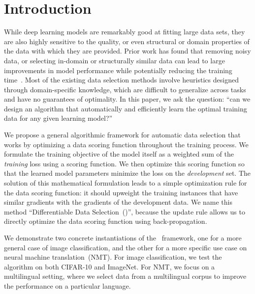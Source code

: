 \section{\label{sec:intro} Introduction}

While deep learning models are remarkably good at fitting large data sets, they are also highly sensitive to the quality, or even structural or domain properties of the data with which they are provided.
Prior work has found that removing noisy data, or selecting in-domain or structurally similar data can lead to large improvements in model performance while potentially reducing the training time~\citep{jiang-zhai-2007-instance,wang-etal-2017-instance,axelrod2011domain,foster-etal-2010-discriminative,moore2010intelligent}. Most of the existing data selection methods involve heuristics designed through domain-specific knowledge, which are difficult to generalize across tasks and have no guarantees of optimality.
In this paper, we ask the question: ``can we design an algorithm that automatically and efficiently learn the optimal training data for any given learning model?''

We propose a general algorithmic framework for automatic data selection that works by optimizing a data scoring function throughout the training process. We formulate the training objective of the model itself as a weighted sum of the \textit{training} loss using a scoring function. We then optimize this scoring function so that the learned model parameters minimize the loss on the \textit{development} set. The solution of this mathematical formulation leads to a simple optimization rule for the data scoring function: it should upweight the training instances that have similar gradients with the gradients of the development data. We name this method ``Differentiable Data Selection~(\dds)'', because the update rule allows us to directly optimize the data scoring function using back-propagation. 

We demonstrate two concrete instantiations of the \dds~framework, one for a more general case of image classification, and the other for a more specific use case on neural machine translation~(NMT). For image classification, we test the algorithm on both CIFAR-10 and ImageNet. For NMT, we focus on a multilingual setting, where we select data from a multilingual corpus to improve the performance on a particular language. 